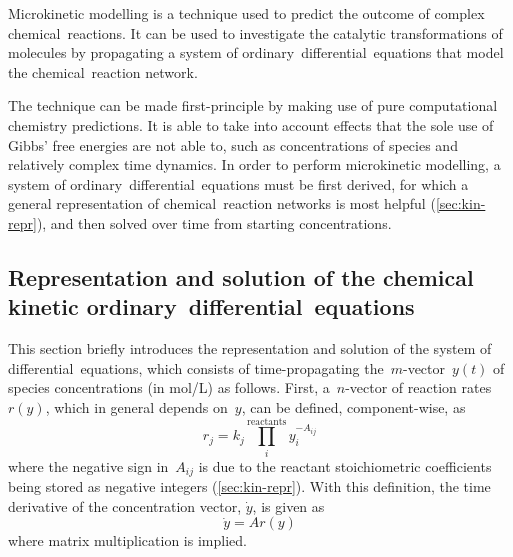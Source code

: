 Microkinetic modelling is a technique used to predict the outcome of complex chemical~reactions.
It can be used to investigate the catalytic transformations of molecules by propagating a system of ordinary~differential~equations that model the chemical~reaction network.

The technique can be made first-principle by making use of pure computational
chemistry predictions.
It is able to take into account effects that the sole use of Gibbs' free energies
are not able to,
such as concentrations of species and relatively complex time dynamics.
In order to perform microkinetic modelling,
a system of ordinary~differential~equations must be first derived,
for which a general representation of chemical~reaction networks is most helpful (\cref{sec:kin-repr}),
and then solved over time from starting concentrations.

\subsection{Representation and solution of the chemical kinetic ordinary~differential~equations}

This section briefly introduces the representation and solution of the system of differential~equations,
which consists of time-propagating the~$m$-vector~$y(t)$ of species concentrations (in mol/L) as follows.
First,
a~$n$-vector of reaction rates~$r(y)$,
which in general depends on~$y$,
can be defined,
component-wise,
as
%
\begin{equation}
	r_j
	= k_j \prod_i^\text{reactants}
	y_i^{-A_{ij}}
\end{equation}
%
where the negative sign in~$A_{ij}$ is due to the reactant stoichiometric coefficients being stored as negative integers (\cref{sec:kin-repr}).
With this definition,
the time derivative of the concentration vector,
$\dot{y}$,
is given as
%
\begin{equation}\label{eq:master-equation}
	\dot{y} = A r(y)
\end{equation}
%
where matrix multiplication is implied.

